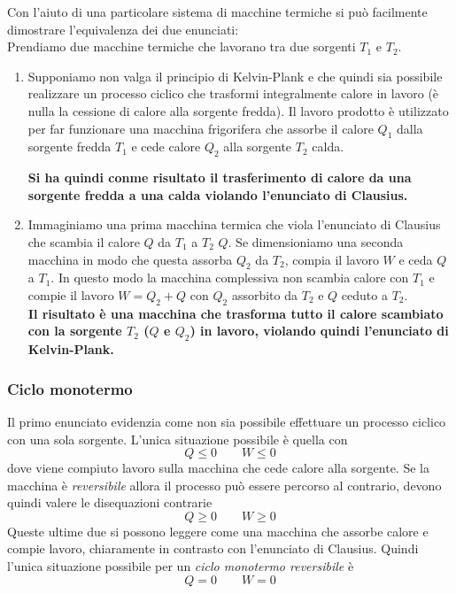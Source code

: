 \documentclass[x11names]{report}
\begin{document}
	Con l'aiuto di una particolare sistema di macchine termiche si può facilmente dimostrare l'equivalenza dei due enunciati: \\
	
	\noindent
	Prendiamo due macchine termiche che lavorano tra due sorgenti \(T_{1}\)
	e \(T_{2}\).
	\begin{enumerate}
		\item Supponiamo non valga il principio di Kelvin-Plank e che quindi sia possibile realizzare un processo ciclico  che trasformi integralmente calore in lavoro (è nulla la cessione di calore alla sorgente fredda). Il lavoro prodotto è utilizzato per far funzionare una macchina frigorifera che assorbe il calore \(Q_{1}\) dalla sorgente fredda \(T_{1}\) e cede calore \(Q_{2}\) alla sorgente \(T_{2}\) calda.
		
		\textbf{Si ha quindi conme risultato il trasferimento di calore da una sorgente fredda a una calda violando l'enunciato di Clausius.}
		
		\item Immaginiamo una prima macchina termica che viola l'enunciato di Clausius che scambia il calore \(Q\) da \(T_{1}\) a \(T_{2}\) \(Q\). Se dimensioniamo una seconda macchina in modo che questa assorba \(Q_{2}\) da \(T_{2}\), compia il lavoro \(W\) e ceda \(Q\) a \(T_{1}\). In questo modo la macchina complessiva non scambia calore con \(T_{1}\) e compie il lavoro \(W = Q_{2} + Q\) con \(Q_{2}\) assorbito  da \(T_{2}\) e \(Q\) ceduto a \(T_{2}\). \\  
		
		\textbf{Il risultato è una macchina che trasforma tutto il calore scambiato con la sorgente \(T_{2}\) (\(Q\) e \(Q_{2}\)) in lavoro, violando quindi l'enunciato di Kelvin-Plank.}
	\end{enumerate}
	
	\subsubsection{Ciclo monotermo}
	Il primo enunciato evidenzia come non sia possibile effettuare un processo ciclico con una sola sorgente. L'unica situazione possibile è quella con 
	\[ 
	Q \leq 0 \qquad W \leq 0
	\]
	dove viene compiuto lavoro sulla macchina che cede calore alla sorgente. Se la macchina è \textit{reversibile} allora il processo può essere percorso al contrario, devono quindi valere le disequazioni contrarie
	\[
	Q \geq 0 \qquad W \geq 0
	\]
	Queste ultime due si possono leggere come una macchina che assorbe calore e compie lavoro, chiaramente in contrasto con l'enunciato di Clausius. Quindi l'unica situazione possibile per un \textit{ciclo monotermo reversibile} è 
	\[ 
	Q = 0 \qquad W = 0
	\]
	
\end{document}
